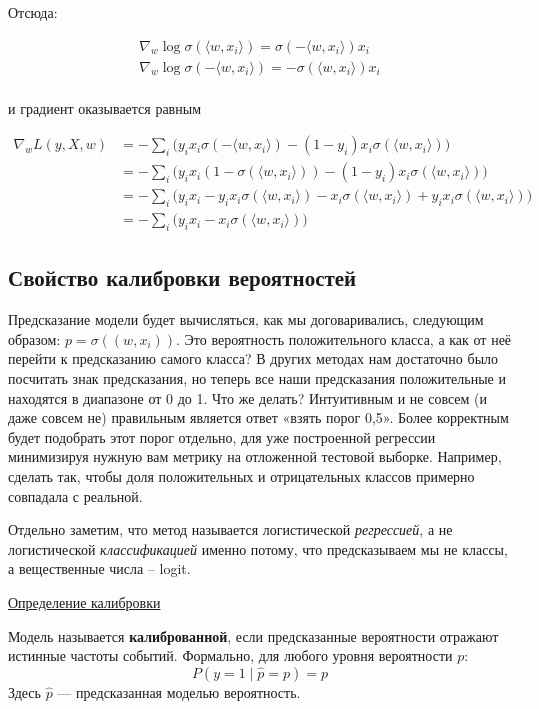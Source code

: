 Отсюда:

\begin{gather*}
    \nabla_w \log \sigma(\langle w, x_i \rangle) = \sigma(-\langle w, x_i \rangle) x_i\\
    \nabla_w \log \sigma(-\langle w, x_i \rangle) = -\sigma(\langle w, x_i \rangle) x_i\\
\end{gather*}

и градиент оказывается равным

\begin{align*}
    \nabla_w L(y, X, w) &= -\sum_i \bigl( y_i x_i \sigma(-\langle w, x_i \rangle) - (1 - y_i) x_i \sigma(\langle w, x_i \rangle) \bigr) \\
    &= -\sum_i \bigl( y_i x_i (1 - \sigma(\langle w, x_i \rangle)) - (1 - y_i) x_i \sigma(\langle w, x_i \rangle) \bigr) \\
    &= -\sum_i \bigl( y_i x_i - y_i x_i \sigma(\langle w, x_i \rangle) - x_i \sigma(\langle w, x_i \rangle) + y_i x_i \sigma(\langle w, x_i \rangle) \bigr) \\
    &= -\sum_i \bigl( y_i x_i - x_i \sigma(\langle w, x_i \rangle) \bigr)
\end{align*}

\subsection{Свойство калибровки вероятностей}

Предсказание модели будет вычисляться, как мы договаривались, следующим образом: $p = \sigma ((w,x_i))$.
Это вероятность положительного класса, а как от неё перейти к предсказанию самого класса?
В других методах нам достаточно было посчитать знак предсказания, но теперь все наши предсказания положительные и
находятся в диапазоне от 0 до 1.
Что же делать?
Интуитивным и не совсем (и даже совсем не) правильным является ответ «взять порог 0,5».
Более корректным будет подобрать этот порог отдельно, для уже построенной регрессии минимизируя нужную вам метрику
на отложенной тестовой выборке.
Например, сделать так, чтобы доля положительных и отрицательных классов примерно совпадала с реальной.

Отдельно заметим, что метод называется логистической \textit{регрессией}, а не логистической \textit{классификацией}
именно потому, что предсказываем мы не классы, а вещественные числа -- logit.

\underline{Определение калибровки}

\begin{definition}
    Модель называется \textbf{калиброванной}, если предсказанные вероятности отражают истинные частоты событий.
    Формально, для любого уровня вероятности $p$:
    \[ P\left(y = 1 \mid \hat{p} = p\right) = p \]
    Здесь $\hat{p}$ --- предсказанная моделью вероятность.
\end{definition}

